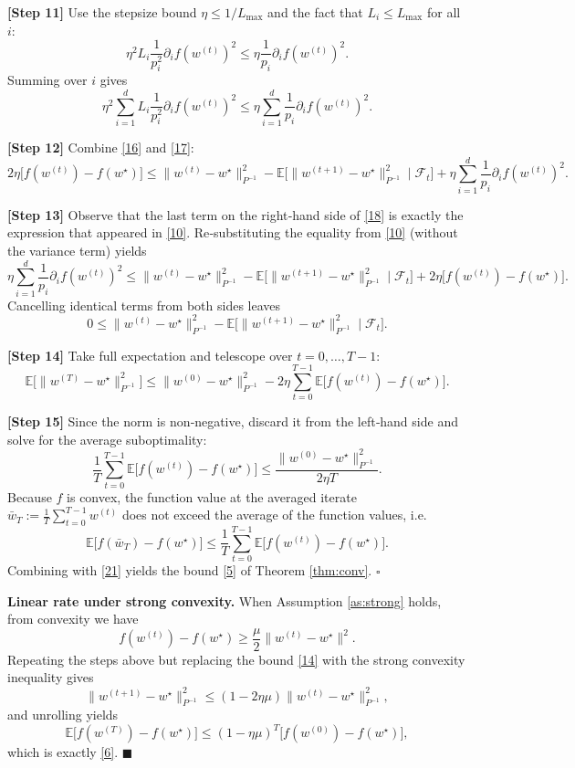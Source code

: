 \documentclass{article}
\newcommand{\E}{\mathbb{E}}
\begin{document}
\noindent\textbf{[Step 11]}  Use the stepsize bound $\eta\le 1/L_{\max}$ and the fact that
$L_i\le L_{\max}$ for all $i$:
\[
\eta^{2}L_i\frac{1}{p_i^{2}}\partial_i f(w^{(t)})^{2}
\le \eta\frac{1}{p_i}\partial_i f(w^{(t)})^{2}.
\]
Summing over $i$ gives
\[
\eta^{2}\sum_{i=1}^{d}L_i\frac{1}{p_i^{2}}\partial_i f(w^{(t)})^{2}
\le \eta\sum_{i=1}^{d}\frac{1}{p_i}\partial_i f(w^{(t)})^{2}.
\tag{17}
\]

\noindent\textbf{[Step 12]}  Combine \eqref{16} and \eqref{17}:
\[
2\eta\bigl[f(w^{(t)})-f(w^{\star})\bigr]
\le \|w^{(t)}-w^{\star}\|_{P^{-1}}^{2}
    -\E\!\bigl[\|w^{(t+1)}-w^{\star}\|_{P^{-1}}^{2}\mid\mathcal{F}_t\bigr]
    +\eta\sum_{i=1}^{d}\frac{1}{p_i}\partial_i f(w^{(t)})^{2}.
\tag{18}
\]

\noindent\textbf{[Step 13]}  Observe that the last term on the right‑hand side of
\eqref{18} is exactly the expression that appeared in \eqref{10}. Re‑substituting
the equality from \eqref{10} (without the variance term) yields
\[
\eta\sum_{i=1}^{d}\frac{1}{p_i}\partial_i f(w^{(t)})^{2}
\le \|w^{(t)}-w^{\star}\|_{P^{-1}}^{2}
    -\E\!\bigl[\|w^{(t+1)}-w^{\star}\|_{P^{-1}}^{2}\mid\mathcal{F}_t\bigr]
    +2\eta\bigl[f(w^{(t)})-f(w^{\star})\bigr].
\]
Cancelling identical terms from both sides leaves
\[
0\le \|w^{(t)}-w^{\star}\|_{P^{-1}}^{2}
    -\E\!\bigl[\|w^{(t+1)}-w^{\star}\|_{P^{-1}}^{2}\mid\mathcal{F}_t\bigr].
\tag{19}
\]

\noindent\textbf{[Step 14]}  Take full expectation and telescope over $t=0,\dots,T-1$:
\[
\E\!\bigl[\|w^{(T)}-w^{\star}\|_{P^{-1}}^{2}\bigr]
\le \|w^{(0)}-w^{\star}\|_{P^{-1}}^{2}
    -2\eta\sum_{t=0}^{T-1}\E\!\bigl[f(w^{(t)})-f(w^{\star})\bigr].
\tag{20}
\]

\noindent\textbf{[Step 15]}  Since the norm is non‑negative, discard it from the left‑hand side and solve for the average suboptimality:
\[
\frac{1}{T}\sum_{t=0}^{T-1}\E\!\bigl[f(w^{(t)})-f(w^{\star})\bigr]
\le \frac{\|w^{(0)}-w^{\star}\|_{P^{-1}}^{2}}{2\eta T}.
\tag{21}
\]
Because $f$ is convex, the function value at the averaged iterate
$\bar w_T:=\frac1T\sum_{t=0}^{T-1}w^{(t)}$ does not exceed the average of the
function values, i.e.
\[
\E\!\bigl[f(\bar w_T)-f(w^{\star})\bigr]\le \frac{1}{T}\sum_{t=0}^{T-1}\E\!\bigl[f(w^{(t)})-f(w^{\star})\bigr].
\]
Combining with \eqref{21} yields the bound \eqref{5} of Theorem \ref{thm:conv}.
\hfill $\square$

\bigskip
\noindent\textbf{Linear rate under strong convexity.}  
When Assumption \ref{as:strong} holds, from convexity we have
\[
f(w^{(t)})-f(w^{\star})\ge \frac{\mu}{2}\|w^{(t)}-w^{\star}\|^{2}.
\]
Repeating the steps above but replacing the bound \eqref{14} with the strong
convexity inequality gives
\[
\|w^{(t+1)}-w^{\star}\|_{P^{-1}}^{2}
\le (1-2\eta\mu)\|w^{(t)}-w^{\star}\|_{P^{-1}}^{2},
\]
and unrolling yields
\[
\E\!\bigl[f(w^{(T)})-f(w^{\star})\bigr]
\le (1-\eta\mu)^{T}\bigl[f(w^{(0)})-f(w^{\star})\bigr],
\]
which is exactly \eqref{6}. \hfill $\blacksquare$
\end{document}
